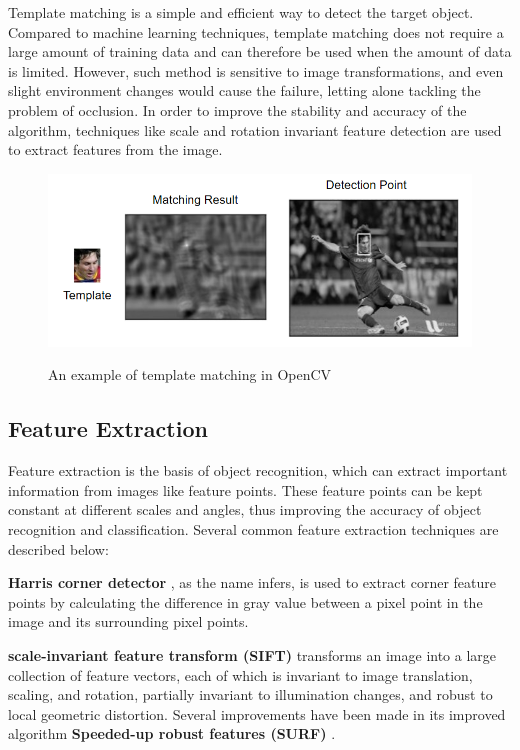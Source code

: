 Template matching is a simple and efficient way to detect the target object. Compared to 
machine learning techniques, template matching does not require a large amount of training data and can therefore be used when the amount of data is limited. However, such method is sensitive to image transformations, and even slight environment changes would cause the failure, letting alone tackling the problem of occlusion. In order to improve the stability and accuracy of the algorithm, techniques like scale and rotation invariant feature detection are used to extract features from the image.

\begin{figure}[h]
  \centering
  \includegraphics[width=1\textwidth]{Figures/Template_Matching.png}
  \caption{An example of template matching in OpenCV} \cite{opencv}
  \label{fig:3}
  
\end{figure}


\subsection{Feature Extraction}

Feature extraction is the basis of object recognition, which can extract important information from images like feature points. These feature points can be kept constant at different scales and angles, thus improving the accuracy of object recognition and classification. Several common feature extraction techniques are described below:

\textbf{Harris corner detector} \cite{harris1988combined}, as the name infers, is used to extract corner feature points by calculating the difference in gray value between a pixel point in the image and its surrounding pixel points. 

\textbf{scale-invariant feature transform (SIFT)} \cite{lowe1999object} transforms an image into a large collection of feature vectors, each of which is invariant to image translation, scaling, and rotation, partially invariant to illumination changes, and robust to local geometric distortion. Several improvements have been made in its improved algorithm \textbf{Speeded-up robust features (SURF)} \cite{bay2008speeded}.

